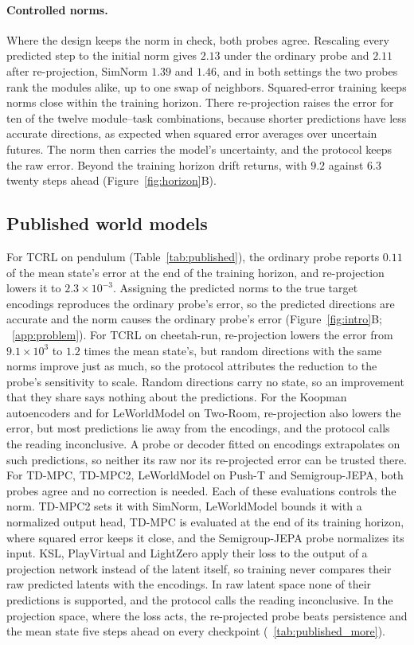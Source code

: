 \paragraph{Controlled norms.}
Where the design keeps the norm in check, both probes agree. Rescaling every predicted step to the initial norm gives $2.13$ under the ordinary probe and $2.11$ after re-projection, SimNorm $1.39$ and $1.46$, and in both settings the two probes rank the modules alike, up to one swap of neighbors. Squared-error training keeps norms close within the training horizon. There re-projection raises the error for ten of the twelve module--task combinations, because shorter predictions have less accurate directions, as expected when squared error averages over uncertain futures. The norm then carries the model's uncertainty, and the protocol keeps the raw error. Beyond the training horizon drift returns, with $9.2$ against $6.3$ twenty steps ahead (Figure~\ref{fig:horizon}B).

\subsection{Published world models}
\label{sec:res_lewm}


For TCRL on pendulum (Table~\ref{tab:published}), the ordinary probe reports $0.11$ of the mean state's error at the end of the training horizon, and re-projection lowers it to $2.3\times10^{-3}$. Assigning the predicted norms to the true target encodings reproduces the ordinary probe's error, so the predicted directions are accurate and the norm causes the ordinary probe's error (Figure~\ref{fig:intro}B; \supsec~\ref{app:problem}). For TCRL on cheetah-run, re-projection lowers the error from $9.1\times10^{3}$ to $1.2$ times the mean state's, but random directions with the same norms improve just as much, so the protocol attributes the reduction to the probe's sensitivity to scale. Random directions carry no state, so an improvement that they share says nothing about the predictions. For the Koopman autoencoders and for LeWorldModel on Two-Room, re-projection also lowers the error, but most predictions lie away from the encodings, and the protocol calls the reading inconclusive. A probe or decoder fitted on encodings extrapolates on such predictions, so neither its raw nor its re-projected error can be trusted there. For TD-MPC, TD-MPC2, LeWorldModel on Push-T and Semigroup-JEPA, both probes agree and no correction is needed. Each of these evaluations controls the norm. TD-MPC2 sets it with SimNorm, LeWorldModel bounds it with a normalized output head, TD-MPC is evaluated at the end of its training horizon, where squared error keeps it close, and the Semigroup-JEPA probe normalizes its input. KSL, PlayVirtual and LightZero apply their loss to the output of a projection network instead of the latent itself, so training never compares their raw predicted latents with the encodings. In raw latent space none of their predictions is supported, and the protocol calls the reading inconclusive. In the projection space, where the loss acts, the re-projected probe beats persistence and the mean state five steps ahead on every checkpoint (\suptab~\ref{tab:published_more}).

